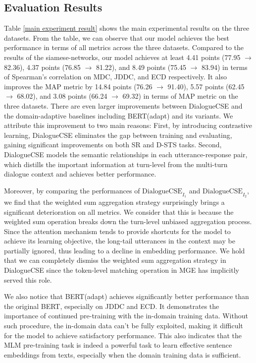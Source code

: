 \documentclass[11pt]{article}
\begin{document}
\subsection{Evaluation Results} 
Table \ref{main experiment result} shows the main experimental results on the three datasets.
From the table, we can observe that our model achieves the best performance in terms of all metrics across the three datasets.
Compared to the results of the siamese-networks, our model achieves at least 4.41 points (77.95 $\rightarrow$ 82.36),  4.37 points (76.85 $\rightarrow$ 81.22), and 8.49 points (75.45 $\rightarrow$ 83.94) in terms of Spearman's correlation on MDC, JDDC, and ECD respectively.
It also improves the MAP metric by 14.84 points (76.26 $\rightarrow$ 91.40), 5.57 points (62.45 $\rightarrow$ 68.02), and 3.08 points (66.24 $\rightarrow$ 69.32) in terms of MAP metric on the three datasets.
There are even larger improvements between DialogueCSE and the domain-adaptive baselines including BERT(adapt) and its variants.
We attribute this improvement to two main reasons: First, by introducing contrastive learning, DialogueCSE eliminates the gap between training and evaluating, gaining significant improvements on both SR and D-STS tasks.
Second, DialogueCSE models the semantic relationships in each utterance-response pair, which distills the important information at turn-level from the multi-turn dialogue context and achieves better performance. 

Moreover, by comparing the performances of $\text{DialogueCSE}_{I_{1}}$ and $\text{DialogueCSE}_{I_{2}}$, we find that the weighted sum aggregation strategy surprisingly brings a significant deterioration on all metrics.
We consider that this is because the weighted sum operation breaks down the turn-level unbiased aggregation process.
Since the attention mechanism tends to provide shortcuts for the model to achieve its learning objective, the long-tail utterances in the context may be partially ignored, thus leading to a decline in embedding performance.
We hold that we can completely dismiss the weighted sum aggregation strategy in DialogueCSE since the token-level matching operation in MGE has implicitly served this role.

We also notice that BERT(adapt) achieves significantly better performance than the original BERT, especially on JDDC and ECD.
It demonstrates the importance of continued pre-training with the in-domain training data.
Without such procedure, the in-domain data can't be fully exploited, making it difficult for the model to achieve satisfactory performance.
This also indicates that the MLM pre-training task is indeed a powerful task to learn effective sentence embeddings from texts, especially when the domain training data is sufficient.
\end{document}
